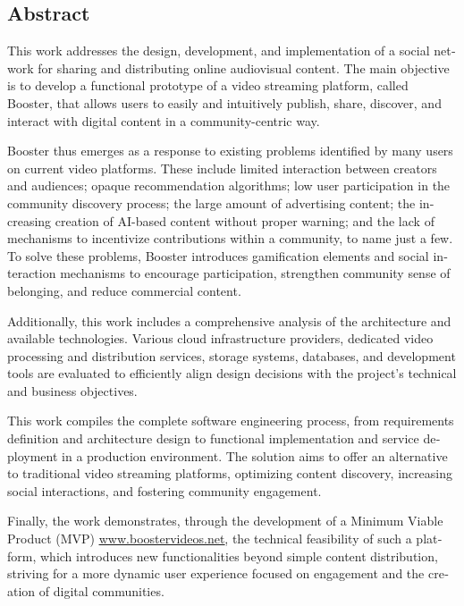 \begin{otherlanguage}{english}
  \chapter*{Abstract}

This work addresses the design, development, and implementation of a social network for sharing and distributing online audiovisual content. The main objective is to develop a functional prototype of a video streaming platform, called Booster, that allows users to easily and intuitively publish, share, discover, and interact with digital content in a community-centric way.

Booster thus emerges as a response to existing problems identified by many users on current video platforms. These include limited interaction between creators and audiences; opaque recommendation algorithms; low user participation in the community discovery process; the large amount of advertising content; the increasing creation of AI-based content without proper warning; and the lack of mechanisms to incentivize contributions within a community, to name just a few. To solve these problems, Booster introduces gamification elements and social interaction mechanisms to encourage participation, strengthen community sense of belonging, and reduce commercial content.

Additionally, this work includes a comprehensive analysis of the architecture and available technologies. Various cloud infrastructure providers, dedicated video processing and distribution services, storage systems, databases, and development tools are evaluated to efficiently align design decisions with the project's technical and business objectives.

This work compiles the complete software engineering process, from requirements definition and architecture design to functional implementation and service deployment in a production environment. The solution aims to offer an alternative to traditional video streaming platforms, optimizing content discovery, increasing social interactions, and fostering community engagement.

Finally, the work demonstrates, through the development of a Minimum Viable Product (MVP) \href{http://boostervideos.net}{\underline{www.boostervideos.net}}, the technical feasibility of such a platform, which introduces new functionalities beyond simple content distribution, striving for a more dynamic user experience focused on engagement and the creation of digital communities.
  
\end{otherlanguage}


